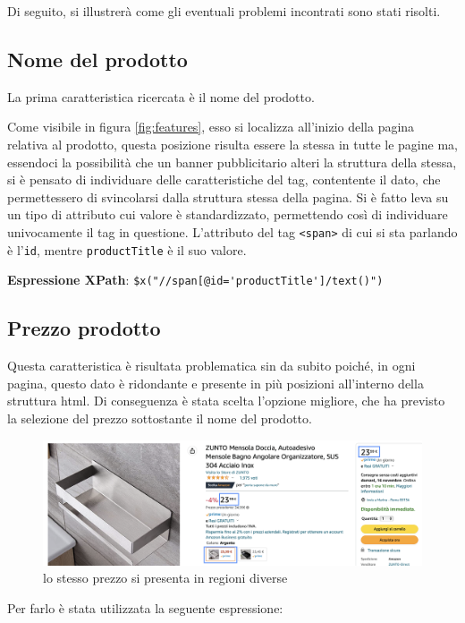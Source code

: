 Di seguito, si illustrerà come gli eventuali problemi incontrati sono stati risolti.

\subsection{Nome del prodotto}
La prima caratteristica ricercata è il nome del prodotto. 

Come visibile in figura \ref{fig:features}, esso si localizza all'inizio della pagina relativa al prodotto, questa posizione risulta essere la stessa in tutte le pagine ma, essendoci la possibilità che un banner pubblicitario alteri la struttura della stessa, si è pensato di individuare delle caratteristiche del tag, contentente il dato, che permettessero di svincolarsi dalla struttura stessa della pagina. Si è fatto leva su un tipo di attributo cui valore è standardizzato, permettendo così di individuare univocamente il tag in questione. L'attributo del tag \texttt{<span>} di cui si sta parlando è l'\texttt{id}, mentre \texttt{productTitle} è il suo valore.

\textbf{Espressione XPath}: \verb|$x("//span[@id='productTitle']/text()")|

\subsection{Prezzo prodotto}

Questa caratteristica è risultata problematica sin da subito poiché, in ogni pagina, questo dato è ridondante e presente in più posizioni all'interno della struttura html. Di conseguenza è stata scelta l'opzione migliore, che ha previsto la selezione del prezzo sottostante il nome del prodotto.

\begin{figure}[h]
    \centering
    \includegraphics[width=\textwidth]{img/prezzi.png}
    \caption{lo stesso prezzo si presenta in regioni diverse}
    \label{fig:prezzi}
\end{figure}

Per farlo è stata utilizzata la seguente espressione:

